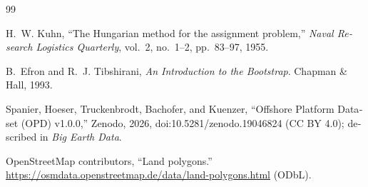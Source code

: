 \begin{thebibliography}{99}
\begin{latin}
 H.~W. Kuhn, ``The Hungarian method for the assignment
problem,'' \emph{Naval Research Logistics Quarterly}, vol.~2, no.~1--2,
pp.~83--97, 1955.

 B.~Efron and R.~J. Tibshirani, \emph{An Introduction to the
Bootstrap}. Chapman \& Hall, 1993.

 Spanier, Hoeser, Truckenbrodt, Bachofer, and Kuenzer,
``Offshore Platform Dataset (OPD) v1.0.0,'' Zenodo, 2026,
doi:10.5281/zenodo.19046824 (CC BY 4.0); described in \emph{Big Earth Data}.

 OpenStreetMap contributors, ``Land polygons.''
\url{https://osmdata.openstreetmap.de/data/land-polygons.html} (ODbL).

\end{latin}
\end{thebibliography}
